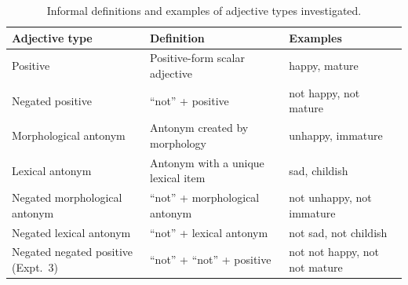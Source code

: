 \documentclass[floatsintext,doc]{apa6}
\begin{document}





%
%

\begin{table}[b]
\centering
\begingroup\fontsize{10pt}{11pt}\selectfont
\begin{tabularx}{\textwidth}{lll}
  \hline
 Adjective type & Definition & Examples \\ 
  \hline
 Positive & Positive-form scalar adjective & happy, mature \\ 
  Negated positive &  ``not'' + positive & not happy, not mature \\ 
  Morphological antonym &  Antonym created by morphology & unhappy, immature \\ 
  Lexical antonym & Antonym with a unique lexical item & sad, childish \\ 
  Negated morphological antonym &  ``not'' + morphological antonym & not unhappy, not immature \\ 
  Negated lexical antonym   &  ``not'' +  lexical antonym & not sad, not childish \\ 
  Negated negated positive (Expt.~3)  &  ``not'' + ``not'' + positive & not not happy, not not mature \\ 
   \hline
\end{tabularx}
\endgroup
\caption{Informal definitions and examples of adjective types investigated.} 
\end{table}
\end{document}
